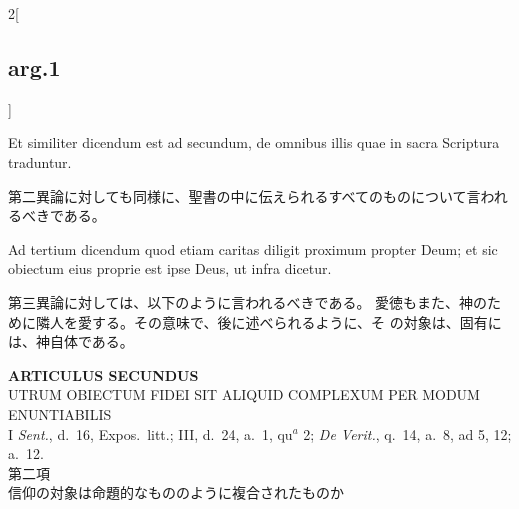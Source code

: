 \documentclass[paper=a4paper,fontsize=10pt,jafontsize=9pt,titlepage]{jlreq}
\begin{document}
\begin{paracol}{2}[\subsection{arg.1}]
\switchcolumn*

Et similiter dicendum est ad secundum,
de omnibus illis quae in sacra Scriptura traduntur.

\switchcolumn

第二異論に対しても同様に、聖書の中に伝えられるすべてのものについて言われ
 るべきである。

\switchcolumn*

Ad tertium dicendum quod etiam caritas
diligit proximum propter Deum; et sic obiectum eius proprie est ipse
Deus, ut infra dicetur.

\switchcolumn

第三異論に対しては、以下のように言われるべきである。
愛徳もまた、神のために隣人を愛する。その意味で、後に述べられるように、そ
 の対象は、固有には、神自体である。

\end{paracol}

\newpage

{}
\setcounter{section}{2}
\setcounter{subsection}{0}
\begin{center}
 {\Large {\bfseries ARTICULUS SECUNDUS}}\\
 {\large UTRUM OBIECTUM FIDEI SIT ALIQUID COMPLEXUM PER MODUM ENUNTIABILIS}\\
 {\footnotesize I {\itshape Sent.}, d.~16, Expos.~litt.; III, d.~24,
 a.~1, qu$^a$ 2; {\itshape De Verit.}, q.~14, a.~8, ad 5, 12; a.~12.}\\
 {\Large 第二項\\信仰の対象は命題的なもののように複合されたものか}
\end{center}
\end{document}
